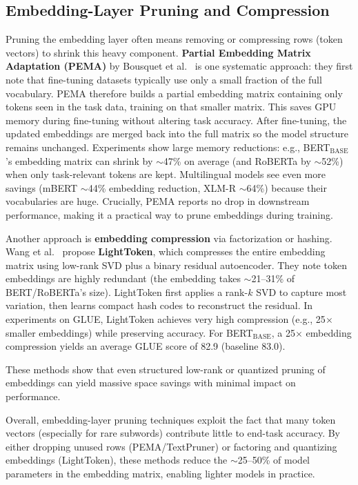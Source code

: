 \documentclass[twocolumn]{article}
\begin{document}
\subsection{Embedding-Layer Pruning and Compression}

Pruning the embedding layer often means removing or compressing rows (token vectors) to shrink this heavy component. \textbf{Partial Embedding Matrix Adaptation (PEMA)} by Bousquet et al.~\cite{bousquet2023pema} is one systematic approach: they first note that fine-tuning datasets typically use only a small fraction of the full vocabulary. PEMA therefore builds a partial embedding matrix containing only tokens seen in the task data, training on that smaller matrix. This saves GPU memory during fine-tuning without altering task accuracy. After fine-tuning, the updated embeddings are merged back into the full matrix so the model structure remains unchanged. Experiments show large memory reductions: e.g., BERT$_{\text{BASE}}$'s embedding matrix can shrink by $\sim$47\% on average (and RoBERTa by $\sim$52\%) when only task-relevant tokens are kept. Multilingual models see even more savings (mBERT $\sim$44\% embedding reduction, XLM-R $\sim$64\%) because their vocabularies are huge. Crucially, PEMA reports no drop in downstream performance, making it a practical way to prune embeddings during training.

Another approach is \textbf{embedding compression} via factorization or hashing. Wang et al.~\cite{wang2023lighttoken} propose \textbf{LightToken}, which compresses the entire embedding matrix using low-rank SVD plus a binary residual autoencoder. They note token embeddings are highly redundant (the embedding takes $\sim$21--31\% of BERT/RoBERTa's size). LightToken first applies a rank-$k$ SVD to capture most variation, then learns compact hash codes to reconstruct the residual. In experiments on GLUE, LightToken achieves very high compression (e.g., 25$\times$ smaller embeddings) while preserving accuracy. For BERT$_{\text{BASE}}$, a 25$\times$ embedding compression yields an average GLUE score of 82.9 (baseline 83.0).

These methods show that even structured low-rank or quantized pruning of embeddings can yield massive space savings with minimal impact on performance.

Overall, embedding-layer pruning techniques exploit the fact that many token vectors (especially for rare subwords) contribute little to end-task accuracy. By either dropping unused rows (PEMA/TextPruner) or factoring and quantizing embeddings (LightToken), these methods reduce the $\sim$25--50\% of model parameters in the embedding matrix, enabling lighter models in practice.
\end{document}
